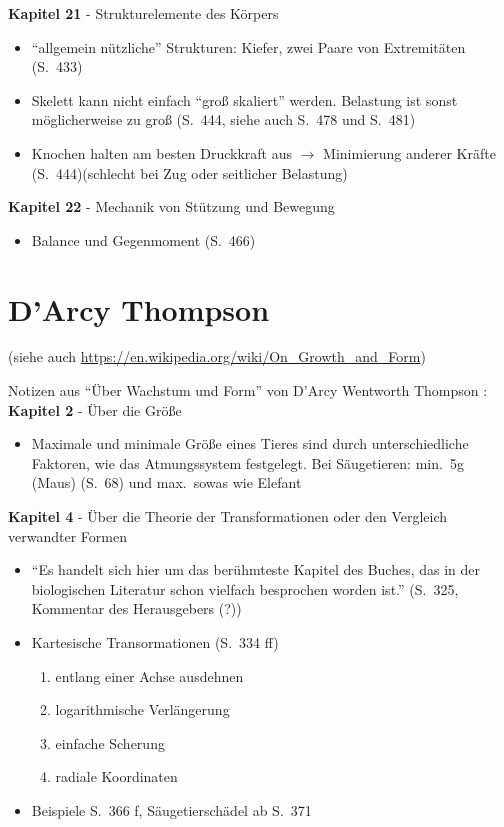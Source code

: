 \textbf{Kapitel 21} - Strukturelemente des Körpers
\begin{itemize}
 \item "`allgemein nützliche"' Strukturen: Kiefer, zwei Paare von Extremitäten (S.\ 433)
 \item Skelett kann nicht einfach "`groß skaliert"' werden. Belastung ist sonst möglicherweise zu groß (S.\ 444, siehe auch S.\ 478 und S.\ 481)
 \item Knochen halten am besten Druckkraft aus $\rightarrow$ Minimierung anderer Kräfte (S.\ 444)(schlecht bei Zug oder seitlicher Belastung)
\end{itemize}

\textbf{Kapitel 22} - Mechanik von Stützung und Bewegung\\
\begin{itemize}
 \item Balance und Gegenmoment (S.\ 466)
\end{itemize}


\chapter{D'Arcy Thompson}
\label{appendix_darcy_thompson}

(siehe auch \url{https://en.wikipedia.org/wiki/On_Growth_and_Form})

Notizen aus "`Über Wachstum und Form"' von D'Arcy Wentworth Thompson \cite{DArcy_Thompson}:\\

\textbf{Kapitel 2} - Über die Größe
\begin{itemize}
 \item Maximale und minimale Größe eines Tieres sind durch unterschiedliche Faktoren, wie \zb das Atmungssystem festgelegt. Bei Säugetieren: min.\ 5g (Maus)  (S.\ 68) und max.\ sowas wie Elefant
\end{itemize}

\textbf{Kapitel 4} - Über die Theorie der Transformationen oder den Vergleich verwandter Formen
\begin{itemize}
 \item "`Es handelt sich hier um das berühmteste Kapitel des Buches, das in der biologischen Literatur schon vielfach besprochen worden ist."' (S.\ 325, Kommentar des Herausgebers (?))
 \item Kartesische Transormationen (S.\ 334 ff)
 \begin{enumerate}
  \item entlang einer Achse ausdehnen
  \item logarithmische Verlängerung
  \item einfache Scherung
  \item radiale Koordinaten
 \end{enumerate}
 \item Beispiele \zb S.\ 366 f, Säugetierschädel ab S.\ 371
\end{itemize}


